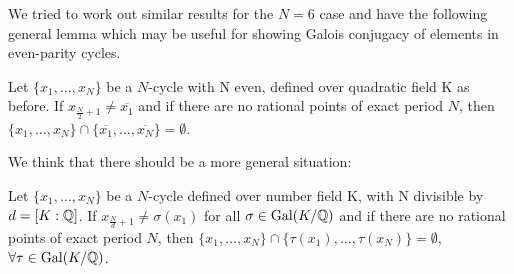 We tried to work out similar results for the $N = 6$ case and have the
following general lemma which may be useful for showing Galois conjugacy of
elements in even-parity cycles.
\begin{lemma}
	Let $\{x_1, \ldots, x_{N}\}$ be a $N$-cycle with N even,
	defined over quadratic field K as before. If
	$x_{\frac{N}{2}+1} \neq \overline{x_1}$ and if there are no
	rational points of exact period $N$, then $\{x_1, \ldots, x_{N}\}
	\cap \{\overline{x_1}, \ldots, \overline{x_{N}}\} = \emptyset$.
\end{lemma}

We think that there should be a more general situation:
\begin{conjecture}
	Let $\{x_1, \ldots, x_{N}\}$ be a $N$-cycle defined over number field K,
	with N divisible by	$d = [K:\mathbb{Q} ]$. If $x_{\frac{N}{d}+1} \neq \sigma(x_1)$
	for all $\sigma \in \mathrm{Gal}(K/\mathbb{Q})$ and if there are no rational points of
	exact period $N$, then $\{x_1, \ldots, x_{N}\} \cap \{\tau(x_1),
	\ldots, \tau(x_{N})\} = \emptyset$, $\forall \tau \in \mathrm{Gal}(K/\mathbb{Q})$.
\end{conjecture}


